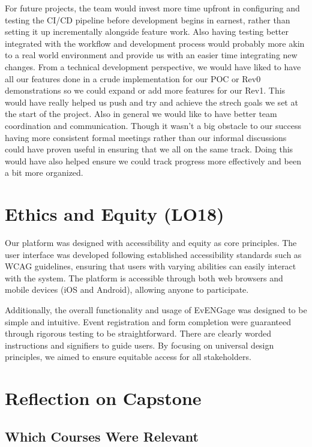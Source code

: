 \documentclass{article}
\begin{document}
For future projects, the team would invest more time upfront in configuring and testing the CI/CD pipeline before development begins in earnest, rather than setting it up incrementally alongside feature work. Also having testing better integrated with the workflow and development process would probably more akin to a real world environment and provide us with an easier time integrating new changes. From a technical development perspective, we would have liked to have all our features done in a crude implementation for our POC or Rev0 demonstrations so we could expand or add more features for our Rev1. This would have really helped us push and try and achieve the strech goals we set at the start of the project.
\newline\newline
Also in general we would like to have better team coordination and communication. Though it wasn't a big obstacle to our success having more consistent formal meetings rather than our informal discussions could have proven useful in ensuring that we all on the same track. Doing this would have also helped ensure we could track progress more effectively and been a bit more organized.



\section{Ethics and Equity (LO18)}

Our platform was designed with accessibility and equity as core principles. The user interface was developed following established accessibility standards such as WCAG guidelines, ensuring that users with varying abilities can easily interact with the system. The platform is accessible through both web browsers and mobile devices (iOS and Android), allowing anyone to participate.

Additionally, the overall functionality and usage of EvENGage was designed to be simple and intuitive. Event registration and form completion were guaranteed through rigorous testing to be straightforward. There are clearly worded instructions and signifiers to guide users. By focusing on universal design principles, we aimed to ensure equitable access for all stakeholders.

\section{Reflection on Capstone}

\subsection{Which Courses Were Relevant}
\end{document}
